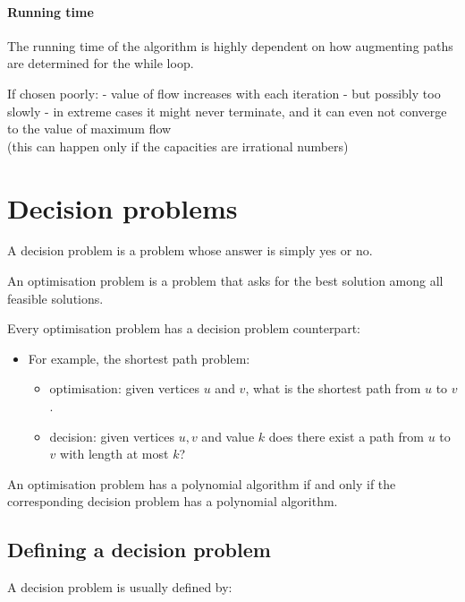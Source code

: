 \documentclass[11pt]{article}
\providecommand{\tightlist}{%
      \setlength{\itemsep}{0pt}\setlength{\parskip}{0pt}}
\begin{document}
    \paragraph{Running time}\label{running-time}

The running time of the algorithm is highly dependent on how augmenting
paths are determined for the while loop.

If chosen poorly: - value of flow increases with each iteration - but
possibly too slowly - in extreme cases it might never terminate, and it
can even not converge to the value of maximum flow\\
(this can happen only if the capacities are irrational numbers)

    \section{Decision problems}\label{decision-problems}

A decision problem is a problem whose answer is simply yes or no.

An optimisation problem is a problem that asks for the best solution
among all feasible solutions.

Every optimisation problem has a decision problem counterpart:

\begin{itemize}
\tightlist
\item
  For example, the shortest path problem:

  \begin{itemize}
  \tightlist
  \item
    optimisation: given vertices \(u\) and \(v\), what is the shortest
    path from \(u\) to \(v\).
  \item
    decision: given vertices \(u, v\) and value \(k\) does there exist a
    path from \(u\) to \(v\) with length at most \(k\)?
  \end{itemize}
\end{itemize}

An optimisation problem has a polynomial algorithm if and only if the
corresponding decision problem has a polynomial algorithm.

    \subsection{Defining a decision
problem}\label{defining-a-decision-problem}

A decision problem is usually defined by:
\end{document}
